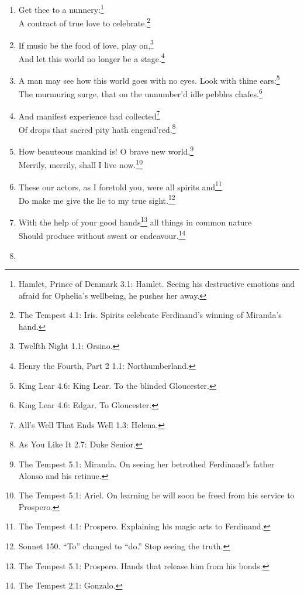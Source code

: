 \documentclass[17pt,twoside]{extarticle}
\begin{document}
\begin{enumerate}
{    Gloucester after learning that Cordelia has lost the battle in order
    to rouse him. No coming, no going. Present moment.}\\I am a fool to
  weep at what I am glad of.\footnote{The Tempest 2.1: Miranda.}
\item
  Get thee to a nunnery:\footnote{Hamlet, Prince of Denmark 3.1: Hamlet.
    Seeing his destructive emotions and afraid for Ophelia's wellbeing,
    he pushes her away.}\\A contract of true love to
  celebrate.\footnote{The Tempest 4.1: Iris. Spirits celebrate
    Ferdinand's winning of Miranda's hand.}
\item
  If music be the food of love, play on,\footnote{Twelfth Night 1.1:
    Orsino.}\\And let this world no longer be a stage.\footnote{Henry
    the Fourth, Part 2 1.1: Northumberland.}
\item
  A man may see how this world goes with no eyes. Look with thine
  ears:\footnote{King Lear 4.6: King Lear. To the blinded Gloucester.}\\The
  murmuring surge, that on the unnumber'd idle pebbles chafes.\footnote{King
    Lear 4.6: Edgar. To Gloucester.}
\item
  And manifest experience had collected\footnote{All's Well That Ends
    Well 1.3: Helena.}\\Of drops that sacred pity hath
  engend'red.\footnote{As You Like It 2.7: Duke Senior.}
\item
  How beauteous mankind is! O brave new world,\footnote{The Tempest 5.1:
    Miranda. On seeing her betrothed Ferdinand's father Alonso and his
    retinue.}\\Merrily, merrily, shall I live now.\footnote{The Tempest
    5.1: Ariel. On learning he will soon be freed from his service to
    Prospero.}
\item
  These our actors, as I foretold you, were all spirits and\footnote{The
    Tempest 4.1: Prospero. Explaining his magic arts to Ferdinand.}\\Do
  make me give the lie to my true sight.\footnote{Sonnet 150. ``To''
    changed to ``do.'' Stop seeing the truth.}
\item
  With the help of your good hands\footnote{The Tempest 5.1: Prospero.
    Hands that release him from his bonds.} all things in common
  nature\\Should produce without sweat or endeavour.\footnote{The
    Tempest 2.1: Gonzalo.}
\item

\end{enumerate}
\end{document}

